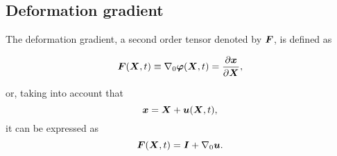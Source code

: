 %


\subsection{Deformation gradient}

The deformation gradient, a second order tensor denoted by $\bm{F}$, is defined as
\begin{highlight}
    \begin{equation}
            \bm{F}(\bm{X},t)\equiv \nabla_0\bm{\varphi}(\bm{X},t) =\frac{\partial \bm{x}}{\partial \bm{X}},
    \end{equation}
\end{highlight}
or, taking into account that
\begin{equation}
    \bm{x} = \bm{X} + \bm{u}(\bm{X}, t),
\end{equation}
it can be expressed as
\begin{equation}
    \bm{F}(\bm{X}, t) = \bm{I} + \nabla_0 \bm u.
\end{equation}

